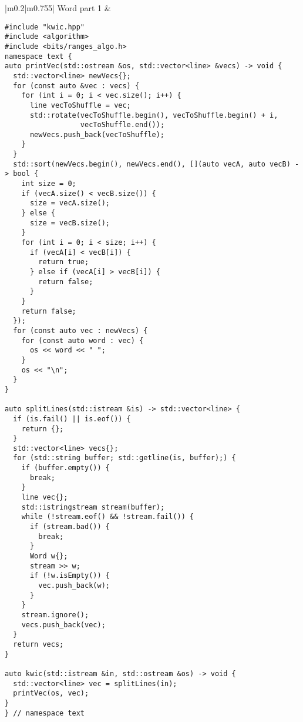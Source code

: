 \documentclass[main.tex,fontsize=8pt,paper=a4,paper=portrait,DIV=calc]{scrartcl}
\begin{document}
\begin{table}[ht!]
\begin{tabular}{|m{0.2\linewidth}|m{0.755\linewidth}|}
\hline
Word part 1 & 
\vspace{2mm}
\begin{lstlisting}
#include "kwic.hpp"
#include <algorithm>
#include <bits/ranges_algo.h>
namespace text {
auto printVec(std::ostream &os, std::vector<line> &vecs) -> void {
  std::vector<line> newVecs{};
  for (const auto &vec : vecs) {
    for (int i = 0; i < vec.size(); i++) {
      line vecToShuffle = vec;
      std::rotate(vecToShuffle.begin(), vecToShuffle.begin() + i,
                  vecToShuffle.end());
      newVecs.push_back(vecToShuffle);
    }
  }
  std::sort(newVecs.begin(), newVecs.end(), [](auto vecA, auto vecB) -> bool {
    int size = 0;
    if (vecA.size() < vecB.size()) {
      size = vecA.size();
    } else {
      size = vecB.size();
    }
    for (int i = 0; i < size; i++) {
      if (vecA[i] < vecB[i]) {
        return true;
      } else if (vecA[i] > vecB[i]) {
        return false;
      }
    }
    return false;
  });
  for (const auto vec : newVecs) {
    for (const auto word : vec) {
      os << word << " ";
    }
    os << "\n";
  }
}

auto splitLines(std::istream &is) -> std::vector<line> {
  if (is.fail() || is.eof()) {
    return {};
  }
  std::vector<line> vecs{};
  for (std::string buffer; std::getline(is, buffer);) {
    if (buffer.empty()) {
      break;
    }
    line vec{};
    std::istringstream stream(buffer);
    while (!stream.eof() && !stream.fail()) {
      if (stream.bad()) {
        break;
      }
      Word w{};
      stream >> w;
      if (!w.isEmpty()) {
        vec.push_back(w);
      }
    }
    stream.ignore();
    vecs.push_back(vec);
  }
  return vecs;
}

auto kwic(std::istream &in, std::ostream &os) -> void {
  std::vector<line> vec = splitLines(in);
  printVec(os, vec);
}
} // namespace text
\end{lstlisting}
\\
\hline
\end{tabular}
\end{table}
\pagebreak
\end{document}
